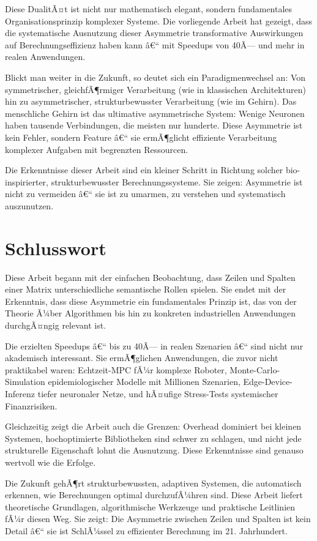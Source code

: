 ﻿\documentclass[a4paper,12pt]{report}
\theoremstyle{definition}
\begin{document}
	Diese DualitÃ¤t ist nicht nur mathematisch elegant, sondern fundamentales Organisationsprinzip komplexer Systeme. Die vorliegende Arbeit hat gezeigt, dass die systematische Ausnutzung dieser Asymmetrie transformative Auswirkungen auf Berechnungseffizienz haben kann â€“ mit Speedups von 40Ã— und mehr in realen Anwendungen.
	
	Blickt man weiter in die Zukunft, so deutet sich ein Paradigmenwechsel an: Von symmetrischer, gleichfÃ¶rmiger Verarbeitung (wie in klassischen Architekturen) hin zu asymmetrischer, strukturbewusster Verarbeitung (wie im Gehirn). Das menschliche Gehirn ist das ultimative asymmetrische System: Wenige Neuronen haben tausende Verbindungen, die meisten nur hunderte. Diese Asymmetrie ist kein Fehler, sondern Feature â€“ sie ermÃ¶glicht effiziente Verarbeitung komplexer Aufgaben mit begrenzten Ressourcen.
	
	Die Erkenntnisse dieser Arbeit sind ein kleiner Schritt in Richtung solcher bio-inspirierter, strukturbewusster Berechnungssysteme. Sie zeigen: Asymmetrie ist nicht zu vermeiden â€“ sie ist zu umarmen, zu verstehen und systematisch auszunutzen.
	
	\section{Schlusswort}
	
	Diese Arbeit begann mit der einfachen Beobachtung, dass Zeilen und Spalten einer Matrix unterschiedliche semantische Rollen spielen. Sie endet mit der Erkenntnis, dass diese Asymmetrie ein fundamentales Prinzip ist, das von der Theorie Ã¼ber Algorithmen bis hin zu konkreten industriellen Anwendungen durchgÃ¤ngig relevant ist.
	
	Die erzielten Speedups â€“ bis zu 40Ã— in realen Szenarien â€“ sind nicht nur akademisch interessant. Sie ermÃ¶glichen Anwendungen, die zuvor nicht praktikabel waren: Echtzeit-MPC fÃ¼r komplexe Roboter, Monte-Carlo-Simulation epidemiologischer Modelle mit Millionen Szenarien, Edge-Device-Inferenz tiefer neuronaler Netze, und hÃ¤ufige Stress-Tests systemischer Finanzrisiken.
	
	Gleichzeitig zeigt die Arbeit auch die Grenzen: Overhead dominiert bei kleinen Systemen, hochoptimierte Bibliotheken sind schwer zu schlagen, und nicht jede strukturelle Eigenschaft lohnt die Ausnutzung. Diese Erkenntnisse sind genauso wertvoll wie die Erfolge.
	
	Die Zukunft gehÃ¶rt strukturbewussten, adaptiven Systemen, die automatisch erkennen, wie Berechnungen optimal durchzufÃ¼hren sind. Diese Arbeit liefert theoretische Grundlagen, algorithmische Werkzeuge und praktische Leitlinien fÃ¼r diesen Weg. Sie zeigt: Die Asymmetrie zwischen Zeilen und Spalten ist kein Detail â€“ sie ist SchlÃ¼ssel zu effizienter Berechnung im 21. Jahrhundert.
	
\end{document}

